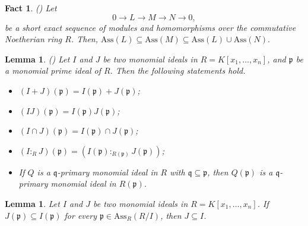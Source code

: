\documentclass[11pt]{amsart}
\newtheorem{fact}[theorem]{Fact}
\newtheorem{lemma}[theorem]{Lemma}
\begin{document}


\begin{fact}\label{fact3} (\cite[Exercise 9.42]{sharp}) 
Let 
$$0\longrightarrow L{\longrightarrow} M {\longrightarrow} N  \longrightarrow  0,$$
be a short exact sequence of modules and homomorphisms over the commutative Noetherian ring $R$. Then, 
$\mathrm{Ass}(L) \subseteq  \mathrm{Ass}(M) \subseteq 
 \mathrm{Ass}(L) \cup  \mathrm{Ass}(N).$ 
\end{fact}





  \begin{lemma}\label{LEM.Localization} (\cite[Lemma 3.13]{SN})
Let $I$ and $J$ be two monomial ideals   in $R=K[x_1, \ldots, x_n]$, and $\mathfrak{p}$ be a monomial prime ideal of $R$. Then the following 
statements hold.
\begin {itemize}
\item[(i)]  $(I+J)(\mathfrak{p})= I(\mathfrak{p}) + J(\mathfrak{p})$;
\item[(ii)] $(IJ)(\mathfrak{p})= I(\mathfrak{p})  J(\mathfrak{p})$;
\item[(iii)] $(I\cap J)(\mathfrak{p})= I(\mathfrak{p}) \cap  J(\mathfrak{p})$;
\item[(iv)] $(I :_RJ)(\mathfrak{p})= (I(\mathfrak{p}) :_{R(\mathfrak{p})}  J(\mathfrak{p}))$;
\item[(v)]  If $Q$ is a $\mathfrak{q}$-primary monomial ideal in $R$ with $ \mathfrak{q}\subseteq \mathfrak{p}$, then $Q(\mathfrak{p})$ is a $\mathfrak{q}$-primary monomial ideal in $R(\mathfrak{p})$.
\end{itemize}
 \end{lemma}



\begin{lemma} \label{Mat-Local}
 Let $I$ and $J$ be two monomial  ideals in $R=K[x_1, \ldots, x_n]$. If    $J(\mathfrak{p})\subseteq I(\mathfrak{p})$ 
 for  every  $\mathfrak{p}\in \mathrm{Ass}_R(R/I)$, then $J\subseteq I$. 
  \end{lemma}
 
\end{document}
